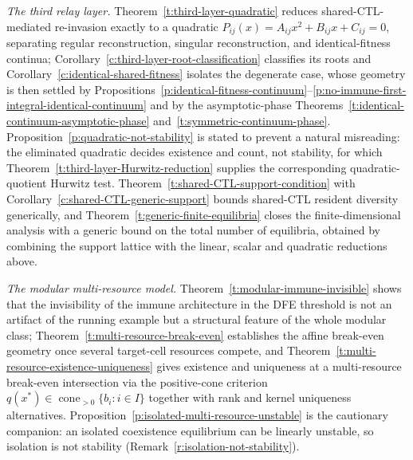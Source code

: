 \emph{The third relay layer.}
Theorem~\ref{t:third-layer-quadratic} reduces shared-CTL-mediated re-invasion exactly to a quadratic
$P_{ij}(x)=A_{ij}x^2+B_{ij}x+C_{ij}=0$, separating regular reconstruction, singular reconstruction, and
identical-fitness continua; Corollary~\ref{c:third-layer-root-classification} classifies its roots and
Corollary~\ref{c:identical-shared-fitness} isolates the degenerate case, whose geometry is then settled by
Propositions~\ref{p:identical-fitness-continuum}--\ref{p:no-immune-first-integral-identical-continuum} and
by the asymptotic-phase Theorems~\ref{t:identical-continuum-asymptotic-phase}
and~\ref{t:symmetric-continuum-phase}. Proposition~\ref{p:quadratic-not-stability} is stated to prevent a
natural misreading: the eliminated quadratic decides existence and count, not stability, for which
Theorem~\ref{t:third-layer-Hurwitz-reduction} supplies the corresponding quadratic-quotient Hurwitz test.
Theorem~\ref{t:shared-CTL-support-condition} with Corollary~\ref{c:shared-CTL-generic-support} bounds
shared-CTL resident diversity generically, and Theorem~\ref{t:generic-finite-equilibria} closes the
finite-dimensional analysis with a generic bound on the total number of equilibria, obtained by combining the
support lattice with the linear, scalar and quadratic reductions above.

\emph{The modular multi-resource model.}
Theorem~\ref{t:modular-immune-invisible} shows that the invisibility of the immune architecture in the DFE
threshold is not an artifact of the running example but a structural feature of the whole modular class;
Theorem~\ref{t:multi-resource-break-even} establishes the affine break-even geometry once several
target-cell resources compete, and Theorem~\ref{t:multi-resource-existence-uniqueness} gives existence and
uniqueness at a multi-resource break-even intersection via the positive-cone criterion
$q(x^*)\in\operatorname{cone}_{>0}\{b_i:i\in I\}$ together with rank and kernel uniqueness alternatives.
Proposition~\ref{p:isolated-multi-resource-unstable} is the cautionary companion: an isolated coexistence
equilibrium can be linearly unstable, so isolation is not stability
(Remark~\ref{r:isolation-not-stability}).

